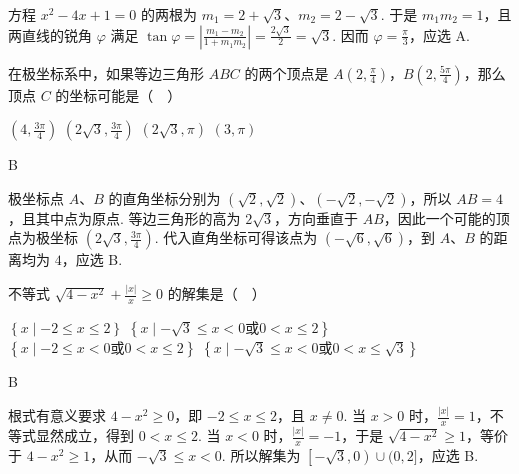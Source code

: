 \documentclass[UTF8,a4paper,oneside,11pt]{ctexbook}
\begin{document}
\begin{solution}
方程 \(x^2-4x+1=0\) 的两根为 \(m_1=2+\sqrt3\)、\(m_2=2-\sqrt3\). 于是 \(m_1m_2=1\)，且两直线的锐角 \(\varphi\) 满足
\(\tan\varphi=\left|\frac{m_1-m_2}{1+m_1m_2}\right|=\frac{2\sqrt3}{2}=\sqrt3\). 因而 \(\varphi=\frac\pi3\)，应选 A.
\end{solution}

\begin{problem}
在极坐标系中，如果等边三角形 \(ABC\) 的两个顶点是 \(A\left( 2,\frac{\pi}{4} \right)\)，\(B\left( 2,\frac{5\pi}{4} \right)\)，那么顶点 \(C\) 的坐标可能是（\(\quad\)）

\choices
    {\(\left( 4,\frac{3\pi}{4} \right)\)}
    {\(\left( 2\sqrt{3},\frac{3\pi}{4} \right)\)}
    {\(\left( 2\sqrt{3},\pi \right)\)}
    {\((3,\pi)\)}
\end{problem}

\begin{answer}
B
\end{answer}

\begin{solution}
极坐标点 \(A\)、\(B\) 的直角坐标分别为 \((\sqrt2,\sqrt2)\)、\((-\sqrt2,-\sqrt2)\)，所以 \(AB=4\)，且其中点为原点. 等边三角形的高为 \(2\sqrt3\)，方向垂直于 \(AB\)，因此一个可能的顶点为极坐标 \(\left(2\sqrt3,\frac{3\pi}{4}\right)\). 代入直角坐标可得该点为 \((-\sqrt6,\sqrt6)\)，到 \(A\)、\(B\) 的距离均为 \(4\)，应选 B.
\end{solution}

\begin{problem}
不等式 \(\sqrt{4-x^2}+\frac{\left| x \right|}{x}\geqslant 0\) 的解集是（\(\quad\)）

\choices
    {\(\left\{ x\mid -2\leqslant x\leqslant 2 \right\}\)}
    {\(\left\{ x\mid -\sqrt{3}\leqslant x<0\text{或}0<x\leqslant 2 \right\}\)}
    {\(\left\{ x\mid -2\leqslant x<0\text{或}0<x\leqslant 2 \right\}\)}
    {\(\left\{ x\mid -\sqrt{3}\leqslant x<0\text{或}0<x\leqslant \sqrt{3} \right\}\)}
\end{problem}

\begin{answer}
B
\end{answer}

\begin{solution}
根式有意义要求 \(4-x^2\geqslant0\)，即 \(-2\leqslant x\leqslant2\)，且 \(x\neq0\). 当 \(x>0\) 时，\(\frac{|x|}{x}=1\)，不等式显然成立，得到 \(0<x\leqslant2\). 当 \(x<0\) 时，\(\frac{|x|}{x}=-1\)，于是
\(\sqrt{4-x^2}\geqslant1\)，等价于 \(4-x^2\geqslant1\)，从而 \(-\sqrt3\leqslant x<0\). 所以解集为 \(\left[-\sqrt3,0\right)\cup(0,2]\)，应选 B.
\end{solution}
\end{document}
